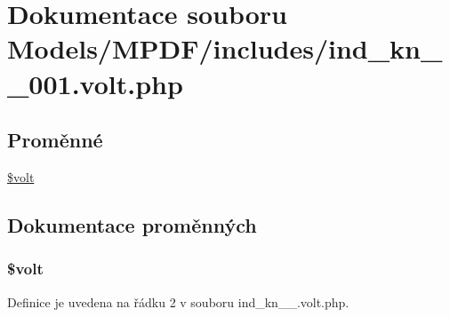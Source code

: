 \hypertarget{ind__kn__1__001_8volt_8php}{\section{Dokumentace souboru Models/\-M\-P\-D\-F/includes/ind\-\_\-kn\-\_\-\_\-001.volt.\-php}
\label{ind__kn__1__001_8volt_8php}
}
\subsection*{Proměnné}
\begin{DoxyCompactItemize}
\item 
\hyperlink{ind__kn__1__001_8volt_8php_a013d9bcd621d002433e25a82dd593989}{\$volt}
\end{DoxyCompactItemize}


\subsection{Dokumentace proměnných}
\hypertarget{ind__kn__1__001_8volt_8php_a013d9bcd621d002433e25a82dd593989}{
\subsubsection[{\$volt}]{\setlength{\rightskip}{0pt plus 5cm}\$volt}}\label{ind__kn__1__001_8volt_8php_a013d9bcd621d002433e25a82dd593989}


Definice je uvedena na řádku 2 v souboru ind\-\_\-kn\-\_\-\_.\-volt.\-php.

